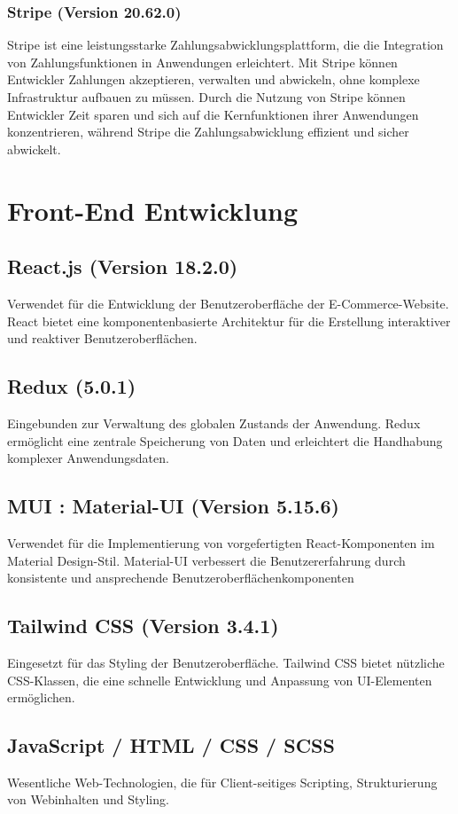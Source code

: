 	\subsubsection{Stripe (Version 20.62.0)}
	Stripe ist eine leistungsstarke Zahlungsabwicklungsplattform, die die Integration von Zahlungsfunktionen in Anwendungen erleichtert. Mit Stripe können Entwickler Zahlungen akzeptieren, verwalten und abwickeln, ohne komplexe Infrastruktur aufbauen zu müssen. Durch die Nutzung von Stripe können Entwickler Zeit sparen und sich auf die Kernfunktionen ihrer Anwendungen konzentrieren, während Stripe die Zahlungsabwicklung effizient und sicher abwickelt.
	
	
	\section{Front-End Entwicklung}
	\subsection{React.js (Version 18.2.0)}
	 Verwendet für die Entwicklung der Benutzeroberfläche der E-Commerce-Website. React bietet eine komponentenbasierte Architektur für die Erstellung interaktiver und reaktiver Benutzeroberflächen.
	 \subsection{Redux (5.0.1)}
	 Eingebunden zur Verwaltung des globalen Zustands der Anwendung. Redux ermöglicht eine zentrale Speicherung von Daten und erleichtert die Handhabung komplexer Anwendungsdaten.
	 \subsection{MUI : Material-UI (Version 5.15.6)}Verwendet für die Implementierung von vorgefertigten React-Komponenten im Material Design-Stil. Material-UI verbessert die Benutzererfahrung durch konsistente und ansprechende Benutzeroberflächenkomponenten
	 \subsection{Tailwind CSS (Version 3.4.1)} Eingesetzt für das Styling der Benutzeroberfläche. Tailwind CSS bietet nützliche CSS-Klassen, die eine schnelle Entwicklung und Anpassung von UI-Elementen ermöglichen.
	  \subsection{JavaScript / HTML / CSS / SCSS} Wesentliche Web-Technologien, die für
	 Client-seitiges Scripting, Strukturierung von Webinhalten und Styling.

